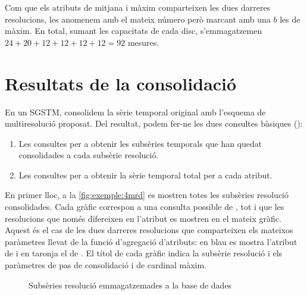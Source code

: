 Com que els atributs de mitjana i màxim comparteixen les dues darreres
resolucions, les anomenem amb el mateix número però marcant amb una
$b$ les de màxim.  En total, sumant les capacitats de cada disc,
s'emmagatzemen $24+20+12+12+12+12=92$ mesures.










\section{Resultats de la consolidació}

En un \gls{SGSTM}, consolidem la sèrie temporal original amb l'esquema
de multiresolució proposat. Del resultat, podem fer-ne les dues consultes bàsiques ():

\begin{enumerate}
\item Les consultes  per a obtenir les
  subsèries temporals que han quedat consolidades a cada subsèrie
  resolució.
\item Les consultes  per a obtenir la sèrie
  temporal total per a cada atribut.
\end{enumerate}


En primer lloc, a la \autoref{fig:exemple:4mrd} es mostren totes les
subsèries resolució consolidades. Cada gràfic correspon a una consulta
possible de , tot i que les resolucions
que només difereixen en l'atribut es mostren en el mateix gràfic.
Aquest és el cas de les dues darreres resolucions que comparteixen els
mateixos paràmetres llevat de la funció d'agregació d'atributs: en
blau es mostra l'atribut de  i en
taronja el de .  El títol de cada gràfic
indica la subsèrie resolució i els paràmetres de pas de consolidació i
de cardinal màxim.


\begin{figure}[tp]
  \centering
  
  \caption{Subsèries resolució emmagatzemades a la base de dades}
  \label{fig:exemple:4mrd}
\end{figure}

